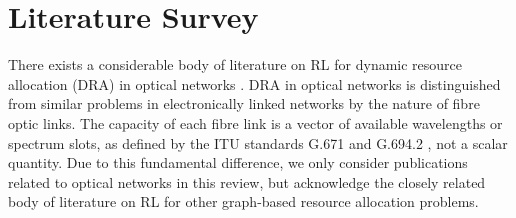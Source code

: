 \section{Literature Survey}
\label{sec:survey}

There exists a considerable body of literature on RL for dynamic resource allocation (DRA) in optical networks \cite{amin_survey_2021}. DRA in optical networks is distinguished from similar problems in electronically linked networks by the nature of fibre optic links. The capacity of each fibre link is a vector of available wavelengths or spectrum slots, as defined by the ITU standards G.671 and G.694.2 \cite{international_telecommunication_union_spectral_2002,international_telecommunication_union_transmission_2012}, not a scalar quantity. Due to this fundamental difference, we only consider publications related to optical networks in this review, but acknowledge the closely related body of literature on RL for other graph-based resource allocation problems.

